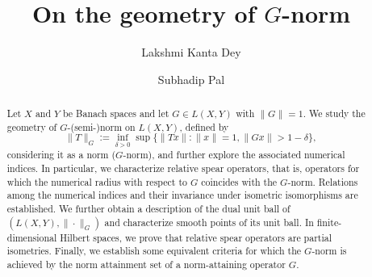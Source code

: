 \documentclass[12pt]{amsart}
\theoremstyle{definition}
\numberwithin{equation}{section}
\begin{document}
	
	\title[On the geometry of $G$-norm]{On the geometry of $G$-norm}
	\author{Lakshmi Kanta Dey}
	\address{Lakshmi Kanta Dey, Department of Mathematics, National Institute of Technology, Durgapur-713209, West Bengal, India.}
	\author{Subhadip Pal}
	\address{Subhadip Pal, Department of Mathematics, National Institute of Technology, Durgapur-713209, West Bengal, India.}
	
	
	\begin{abstract}
		Let $X$ and $Y$ be Banach spaces and let $G \in L(X,Y)$ with $\|G\|=1$. We study the geometry of $G$-(semi-)norm on $L(X,Y)$, defined by
		\[
		\|T\|_G := \inf_{\delta>0}\sup\{\|Tx\|: \|x\|=1, \|Gx\|>1-\delta\},
		\]
		considering it as a norm ($G$-norm), and further explore the associated numerical indices. In particular, we characterize relative spear operators, that is, operators for which the numerical radius with respect to $G$ coincides with the $G$-norm. Relations among the numerical indices and their invariance under isometric isomorphisms are established. We further obtain a description of the dual unit ball of $(L(X,Y),\|\cdot\|_G)$ and characterize smooth points of its unit ball. In finite-dimensional Hilbert spaces, we prove that relative spear operators are partial isometries. Finally, we establish some equivalent criteria for which the $G$-norm is achieved by the norm attainment set of a norm-attaining operator $G$.
	\end{abstract}   
	
	\maketitle
\end{document}
